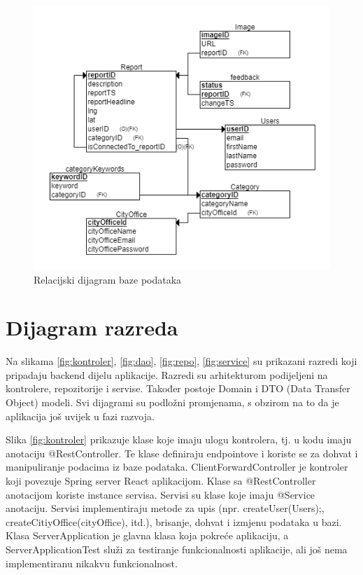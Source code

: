 			\begin{figure}[H]
				\includegraphics[width=\textwidth]{slike/relacijski.png} %
				\caption{Relacijski dijagram baze podataka}
				\label{fig:DijagramBazePodataka} %
			\end{figure}
			
			\eject
			
			
		\section{Dijagram razreda}
		
			Na slikama \ref{fig:kontroler}, \ref{fig:dao}, \ref{fig:repo}, \ref{fig:service} su prikazani razredi koji pripadaju backend dijelu aplikacije. Razredi su arhitekturom podijeljeni na kontrolere, repozitorije i servise. Također postoje Domain i DTO (Data Transfer Object) modeli. Svi dijagrami su podložni promjenama, s obzirom na to da je aplikacija još uvijek u fazi razvoja.
		
			Slika \ref{fig:kontroler} prikazuje klase koje imaju ulogu kontrolera, tj. u kodu imaju anotaciju @RestController. Te klase definiraju endpointove i koriste se za dohvat i manipuliranje podacima iz baze podataka. ClientForwardController je kontroler koji povezuje Spring server React aplikacijom. Klase sa @RestController anotacijom koriste instance servisa. Servisi su klase koje imaju @Service anotaciju. Servisi implementiraju metode za upis (npr. createUser(Users);, createCitiyOffice(cityOffice), itd.), brisanje, dohvat i izmjenu podataka u bazi. Klasa ServerApplication je glavna klasa koja pokreće aplikaciju, a ServerApplicationTest služi za testiranje funkcionalnosti aplikacije, ali još nema implementiranu nikakvu funkcionalnost.
		
